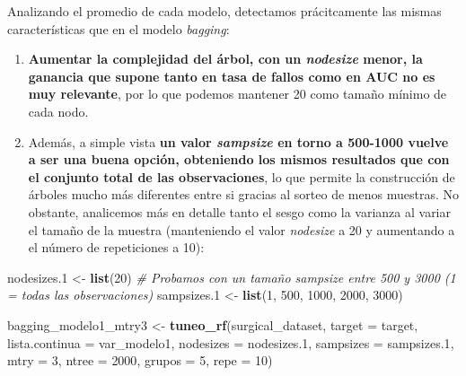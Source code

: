 \documentclass[
]{article}
\newenvironment{Shaded}{\begin{snugshade}}{\end{snugshade}}
\newcommand{\CommentTok}[1]{\textcolor[rgb]{0.56,0.35,0.01}{\textit{#1}}}
\newcommand{\DataTypeTok}[1]{\textcolor[rgb]{0.13,0.29,0.53}{#1}}
\newcommand{\DecValTok}[1]{\textcolor[rgb]{0.00,0.00,0.81}{#1}}
\newcommand{\FloatTok}[1]{\textcolor[rgb]{0.00,0.00,0.81}{#1}}
\newcommand{\KeywordTok}[1]{\textcolor[rgb]{0.13,0.29,0.53}{\textbf{#1}}}
\newcommand{\NormalTok}[1]{#1}
\newcommand{\StringTok}[1]{\textcolor[rgb]{0.31,0.60,0.02}{#1}}
\begin{document}
Analizando el promedio de cada modelo, detectamos prácitcamente las
mismas características que en el modelo \emph{bagging}:

\begin{enumerate}
\def\labelenumi{\arabic{enumi}.}
\item
  \textbf{Aumentar la complejidad del árbol, con un \emph{nodesize}
  menor, la ganancia que supone tanto en tasa de fallos como en AUC no
  es muy relevante}, por lo que podemos mantener 20 como tamaño mínimo
  de cada nodo.
\item
  Además, a simple vista \textbf{un valor \emph{sampsize} en torno a
  500-1000 vuelve a ser una buena opción, obteniendo los mismos
  resultados que con el conjunto total de las observaciones}, lo que
  permite la construcción de árboles mucho más diferentes entre si
  gracias al sorteo de menos muestras. No obstante, analicemos más en
  detalle tanto el sesgo como la varianza al variar el tamaño de la
  muestra (manteniendo el valor \emph{nodesize} a 20 y aumentando a el
  número de repeticiones a 10):
\end{enumerate}

\begin{Shaded}
\begin{Highlighting}[]
\NormalTok{nodesizes}\FloatTok{.1}\NormalTok{ <{-}}\StringTok{ }\KeywordTok{list}\NormalTok{(}\DecValTok{20}\NormalTok{)}
\CommentTok{\# Probamos con un tamaño sampsize entre 500 y 3000 (1 = todas las observaciones)}
\NormalTok{sampsizes}\FloatTok{.1}\NormalTok{ <{-}}\StringTok{ }\KeywordTok{list}\NormalTok{(}\DecValTok{1}\NormalTok{, }\DecValTok{500}\NormalTok{, }\DecValTok{1000}\NormalTok{, }\DecValTok{2000}\NormalTok{, }\DecValTok{3000}\NormalTok{)}

\NormalTok{bagging\_modelo1\_mtry3 <{-}}\StringTok{  }\KeywordTok{tuneo\_rf}\NormalTok{(surgical\_dataset, }\DataTypeTok{target =}\NormalTok{ target,}
                                   \DataTypeTok{lista.continua =}\NormalTok{ var\_modelo1,}
                                   \DataTypeTok{nodesizes =}\NormalTok{ nodesizes}\FloatTok{.1}\NormalTok{,}
                                   \DataTypeTok{sampsizes =}\NormalTok{ sampsizes}\FloatTok{.1}\NormalTok{, }\DataTypeTok{mtry =} \DecValTok{3}\NormalTok{,}
                                   \DataTypeTok{ntree =} \DecValTok{2000}\NormalTok{, }\DataTypeTok{grupos =} \DecValTok{5}\NormalTok{, }\DataTypeTok{repe =} \DecValTok{10}\NormalTok{)}
\end{Highlighting}
\end{Shaded}
\end{document}

